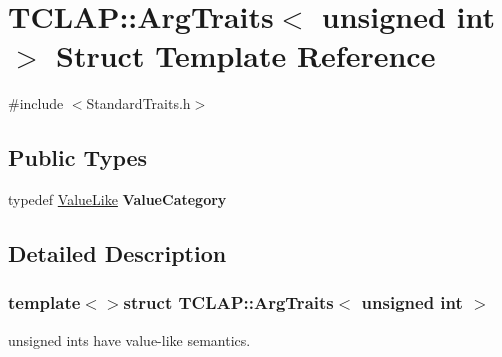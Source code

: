\hypertarget{struct_t_c_l_a_p_1_1_arg_traits_3_01unsigned_01int_01_4}{\section{T\+C\+L\+A\+P\+:\+:Arg\+Traits$<$ unsigned int $>$ Struct Template Reference}
\label{struct_t_c_l_a_p_1_1_arg_traits_3_01unsigned_01int_01_4}
}


{\ttfamily \#include $<$Standard\+Traits.\+h$>$}

\subsection*{Public Types}
\begin{DoxyCompactItemize}
\item 
\hypertarget{struct_t_c_l_a_p_1_1_arg_traits_3_01unsigned_01int_01_4_ae95cdc132665581c458fc64c7e7a0490}{typedef \hyperlink{struct_t_c_l_a_p_1_1_value_like}{Value\+Like} {\bfseries Value\+Category}}\label{struct_t_c_l_a_p_1_1_arg_traits_3_01unsigned_01int_01_4_ae95cdc132665581c458fc64c7e7a0490}

\end{DoxyCompactItemize}


\subsection{Detailed Description}
\subsubsection*{template$<$$>$struct T\+C\+L\+A\+P\+::\+Arg\+Traits$<$ unsigned int $>$}

unsigned ints have value-\/like semantics. 
